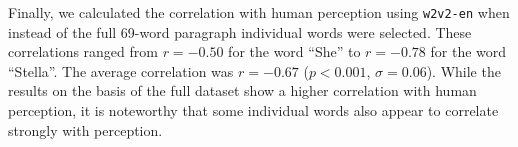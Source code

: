 \documentclass[11pt,a4paper]{article}
\begin{document}

Finally, we calculated the correlation with human perception using \texttt{w2v2-en} when instead of the full 69-word paragraph individual words were selected. These correlations ranged from $r = -0.50$ for the word ``She'' to $r = -0.78$ for the word ``Stella''. The average correlation was $r = -0.67$ ($p < 0.001$, $\sigma = 0.06$). While the results on the basis of the full dataset show a higher correlation with human perception, it is noteworthy that some individual words also appear to correlate strongly with perception. 



\end{document}
